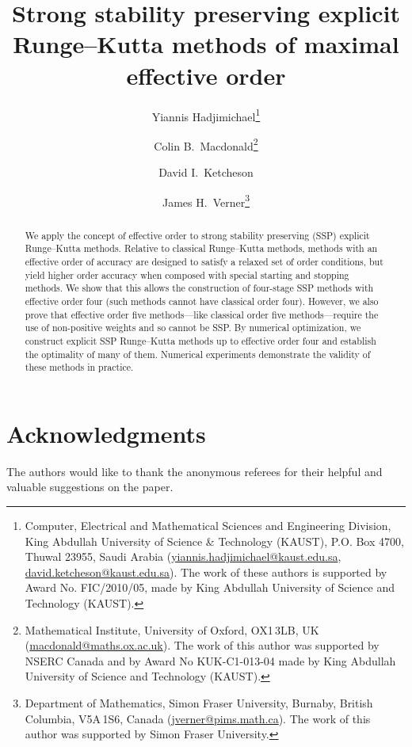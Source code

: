 \documentclass[10pt,a4paper,oneside]{article}
\title{Strong stability preserving explicit Runge--Kutta methods of maximal effective order
}
\author{
        Yiannis Hadjimichael\thanks{Computer, Electrical and Mathematical Sciences and 
        Engineering Division, King Abdullah University of Science \& Technology (KAUST), 
        P.O. Box 4700, Thuwal 23955, Saudi Arabia
        (\url{yiannis.hadjimichael@kaust.edu.sa}, 
        \url{david.ketcheson@kaust.edu.sa}).
        The work of these authors is supported by Award No. FIC/2010/05, made by King 
        Abdullah University of Science and Technology (KAUST).}
        \and 
        Colin B.~Macdonald\thanks{Mathematical Institute, University of Oxford, OX1\,3LB, UK 
        (\url{macdonald@maths.ox.ac.uk}).
        The work of this author was supported by NSERC 
        Canada and by Award No KUK-C1-013-04 made by King Abdullah University of Science 
        and Technology (KAUST).}
        \and 
        David I.~Ketcheson\footnotemark[1]
        \and 
        James H.~Verner\thanks{Department of Mathematics, Simon Fraser University,
        Burnaby, British Columbia, V5A\,1S6, Canada
        (\url{jverner@pims.math.ca}).
        The work of this author was supported by Simon Fraser University.}
}
\date{}
\begin{document}
        \maketitle
        
        \begin{abstract}
                We apply the concept of effective order to strong stability preserving 
                (SSP) explicit Runge--Kutta methods.
                Relative to classical Runge--Kutta methods, methods with an effective order of accuracy
                are designed to satisfy a relaxed set of order conditions, but yield higher 
                order accuracy  when composed with special starting and stopping methods. 
         We show that this allows the construction of four-stage SSP methods with 
         effective order four (such methods cannot have classical order four). 
         However, we also prove that effective order five methods---like classical
         order five methods---require the use of non-positive weights and so cannot
         be SSP.
         By numerical optimization, we construct explicit SSP Runge--Kutta methods 
         up to effective order four and establish the optimality of many of them.
                Numerical experiments demonstrate the validity of these methods in
                practice.
        \end{abstract}
		
%
%
		
        
        
        
        
        
        
        

        \section*{Acknowledgments}{
                The authors would like to thank the anonymous referees for their helpful 
                and valuable suggestions on the paper.
        }

        
\end{document}
